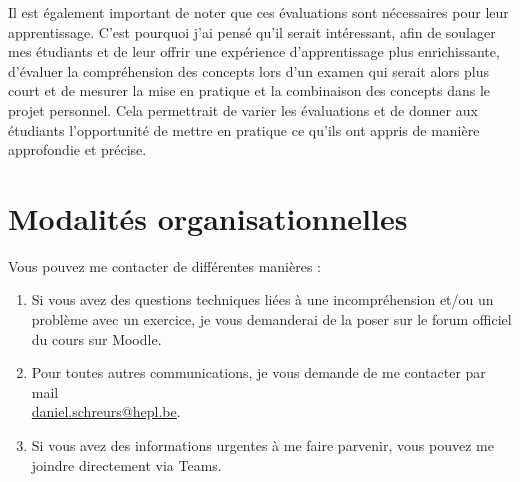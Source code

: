 Il est également important de noter que ces évaluations sont nécessaires pour leur apprentissage. C'est pourquoi j'ai pensé qu'il serait intéressant, afin de soulager mes étudiants et de leur offrir une expérience d'apprentissage plus enrichissante, d'évaluer la compréhension des concepts lors d'un examen qui serait alors plus court et de mesurer la mise en pratique et la combinaison des concepts dans le projet personnel. Cela permettrait de varier les évaluations et de donner aux étudiants l'opportunité de mettre en pratique ce qu'ils ont appris de manière approfondie et précise.

\clearpage

\section{Modalités organisationnelles}

Vous pouvez me contacter de différentes manières :
\begin{enumerate}
    \item Si vous avez des questions techniques liées à une incompréhension et/ou un problème avec un exercice, je vous demanderai de la poser sur le forum officiel du cours sur Moodle.
    \item Pour toutes autres communications, je vous demande de me contacter par mail\\ \href{mailto:daniel.schreurs@hepl.be}{daniel.schreurs@hepl.be}.
    \item Si vous avez des informations urgentes à me faire parvenir, vous pouvez me joindre directement via Teams.
\end{enumerate}
